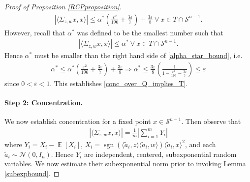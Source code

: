 \documentclass[11pt]{article}
\renewcommand{\epsilon}{\varepsilon}
\newcommand{\al}{\alpha}
\newcommand{\E}{\operatorname{\mathbb{E}}}
\newcommand{\sign}{\operatorname{sgn}}
\newcommand{\Seps}{\mathcal{S}}
\theoremstyle{remark}
\begin{document}
\begin{proof}[Proof of Proposition \ref{RCPproposition}]
\begin{align}
|\langle \Sigma_{z,w} x,x \rangle| \leqslant \al^*\left(\frac{\epsilon^2}{196} + \frac{3\epsilon}{7}\right) + \frac{3\epsilon}{8}\ \forall\ x \in T \cap \mathcal{S}^{n-1}. \label{alpha_star_bound}
\end{align} However, recall that $\al^*$ was defined to be the smallest number such that \begin{align*}
|\langle \Sigma_{z,w} x,x \rangle| \leqslant \al^*\ \forall\ x \in T \cap \mathcal{S}^{n-1}.
\end{align*} Hence $\al^*$ must be smaller than the right hand side of \eqref{alpha_star_bound}, i.e. \begin{align*}
\al^* \leqslant \al^*\left(\frac{\epsilon^2}{196} + \frac{3\epsilon}{7}\right) + \frac{3\epsilon}{8} \Longrightarrow \al^* \leqslant \frac{3\epsilon}{8}\left(\frac{1}{1 - \frac{\epsilon^2}{196} - \frac{3\epsilon}{7}}\right) \leqslant \epsilon
\end{align*} since $0 < \epsilon < 1$. This establishes \eqref{conc_over_Q_implies_T}.


\paragraph{Step 2: Concentration.} We now establish concentration for a fixed point $x \in \Seps^{n-1}$. Then observe that \begin{align*}
\left|\langle \Sigma_{z,w} x,x \rangle \right| = \frac{1}{m} \left|\sum_{i=1}^m Y_i \right|
\end{align*} where $Y_i = X_i - \E[X_i]$, $X_i = \sign(\langle \tilde{a}_i,z \rangle \langle \tilde{a}_i, w\rangle) \langle \tilde{a}_i , x\rangle^2$, and  each $\tilde{a}_i \sim \mathcal{N}(0,I_n)$. Hence $Y_i$ are independent, centered, subexponential random variables. We now estimate their subexponential norm prior to invoking Lemma \ref{subexpbound}.


\end{proof}
\end{document}
